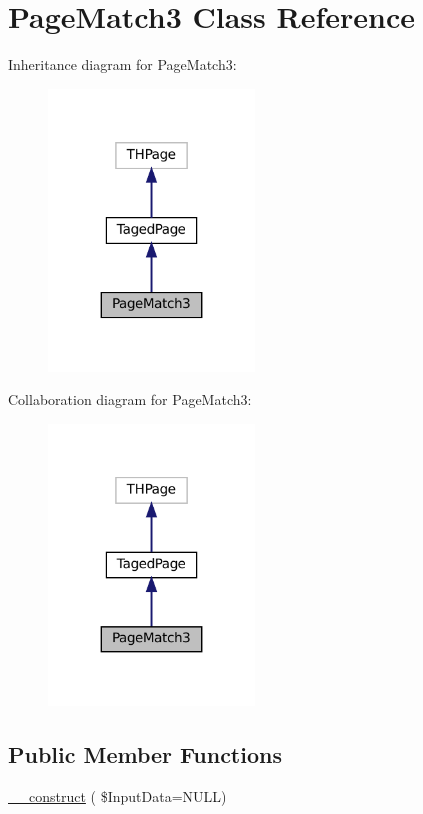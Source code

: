 \hypertarget{class_page_match3}{}\section{Page\+Match3 Class Reference}
\label{class_page_match3}


Inheritance diagram for Page\+Match3\+:\nopagebreak
\begin{figure}[H]
\begin{center}
\leavevmode
\includegraphics[width=155pt]{class_page_match3__inherit__graph}
\end{center}
\end{figure}


Collaboration diagram for Page\+Match3\+:\nopagebreak
\begin{figure}[H]
\begin{center}
\leavevmode
\includegraphics[width=155pt]{class_page_match3__coll__graph}
\end{center}
\end{figure}
\subsection*{Public Member Functions}
\begin{DoxyCompactItemize}
\item 
\hyperlink{class_page_match3_a0364bbcc5b3685b0aa241ecac15697a4}{\+\_\+\+\_\+construct} ( \$Input\+Data=N\+U\+LL)
\end{DoxyCompactItemize}
